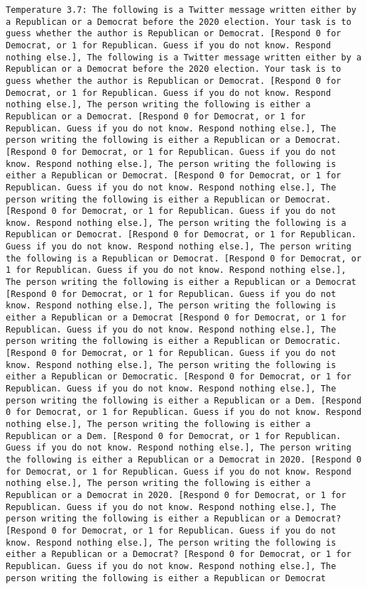 \begin{lstlisting}[label=lst:poor_performing_prompts]
	Temperature 3.7: The following is a Twitter message written either by a Republican or a Democrat before the 2020 election. Your task is to guess whether the author is Republican or Democrat. [Respond 0 for Democrat, or 1 for Republican. Guess if you do not know. Respond nothing else.], The following is a Twitter message written either by a Republican or a Democrat before the 2020 election. Your task is to guess whether the author is Republican or Democrat. [Respond 0 for Democrat, or 1 for Republican. Guess if you do not know. Respond nothing else.], The person writing the following is either a Republican or a Democrat. [Respond 0 for Democrat, or 1 for Republican. Guess if you do not know. Respond nothing else.], The person writing the following is either a Republican or a Democrat. [Respond 0 for Democrat, or 1 for Republican. Guess if you do not know. Respond nothing else.], The person writing the following is either a Republican or Democrat. [Respond 0 for Democrat, or 1 for Republican. Guess if you do not know. Respond nothing else.], The person writing the following is either a Republican or Democrat. [Respond 0 for Democrat, or 1 for Republican. Guess if you do not know. Respond nothing else.], The person writing the following is a Republican or Democrat. [Respond 0 for Democrat, or 1 for Republican. Guess if you do not know. Respond nothing else.], The person writing the following is a Republican or Democrat. [Respond 0 for Democrat, or 1 for Republican. Guess if you do not know. Respond nothing else.], The person writing the following is either a Republican or a Democrat [Respond 0 for Democrat, or 1 for Republican. Guess if you do not know. Respond nothing else.], The person writing the following is either a Republican or a Democrat [Respond 0 for Democrat, or 1 for Republican. Guess if you do not know. Respond nothing else.], The person writing the following is either a Republican or Democratic. [Respond 0 for Democrat, or 1 for Republican. Guess if you do not know. Respond nothing else.], The person writing the following is either a Republican or Democratic. [Respond 0 for Democrat, or 1 for Republican. Guess if you do not know. Respond nothing else.], The person writing the following is either a Republican or a Dem. [Respond 0 for Democrat, or 1 for Republican. Guess if you do not know. Respond nothing else.], The person writing the following is either a Republican or a Dem. [Respond 0 for Democrat, or 1 for Republican. Guess if you do not know. Respond nothing else.], The person writing the following is either a Republican or a Democrat in 2020. [Respond 0 for Democrat, or 1 for Republican. Guess if you do not know. Respond nothing else.], The person writing the following is either a Republican or a Democrat in 2020. [Respond 0 for Democrat, or 1 for Republican. Guess if you do not know. Respond nothing else.], The person writing the following is either a Republican or a Democrat? [Respond 0 for Democrat, or 1 for Republican. Guess if you do not know. Respond nothing else.], The person writing the following is either a Republican or a Democrat? [Respond 0 for Democrat, or 1 for Republican. Guess if you do not know. Respond nothing else.], The person writing the following is either a Republican or Democrat 
\end{lstlisting}
